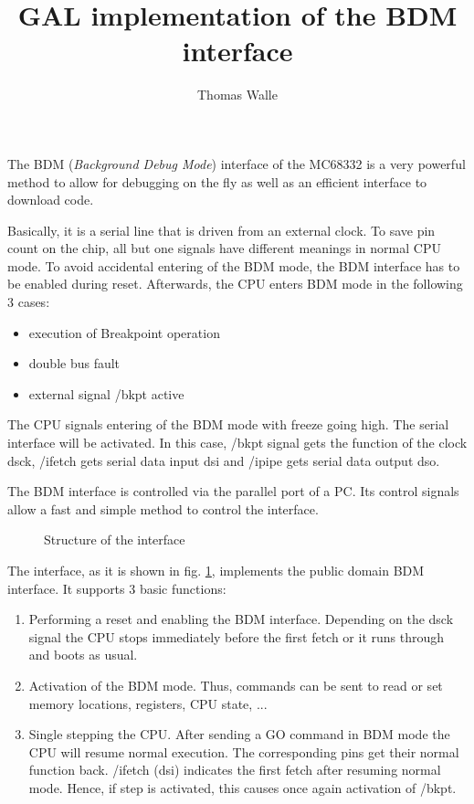 \documentclass[12pt]{article}
\title{GAL implementation of the BDM interface}
\author{Thomas Walle}
\newcommand{\bi}{\begin{itemize}}
\newcommand{\ei}{\end{itemize}}
\newcommand{\be}{\begin{enumerate}}
\newcommand{\ee}{\end{enumerate}}
\newcommand{\myfig}[4]{%
  \begin{figure}[htbp] \begin{center}%
  \makebox{\epsfysize=#2 \epsfbox{#1}} \caption{\label{#3} #4}%
  \end{center} \end{figure}}
\begin{document}
\maketitle

The BDM ({\it Background Debug Mode}) interface of the MC68332 is a
very powerful method to allow for debugging on the fly as well as an
efficient interface to download code.

Basically, it is a serial line that is driven from an external
clock. To save pin count on the chip, all but one signals have
different meanings in normal CPU mode. To avoid accidental entering of
the BDM mode, the BDM interface has to be enabled during
reset. Afterwards, the CPU enters BDM mode in the following 3 cases:

\bi
\item execution of Breakpoint operation
\item double bus fault
\item external signal {\sc /bkpt} active
\ei

The CPU signals entering of the BDM mode with {\sc freeze} going high.
The serial interface will be activated. In this case, {\sc /bkpt}
signal gets the function of the clock {\sc dsck}, {\sc /ifetch} gets
serial data input {\sc dsi} and {\sc /ipipe} gets serial data output
{\sc dso}.

The BDM interface is controlled via the parallel port of a PC. Its
control signals allow a fast and simple method to control the
interface.

\myfig{gal.eps}{70mm}{gal.fig}{Structure of the interface}

The interface, as it is shown in fig. \ref{gal.fig}, implements the
public domain BDM interface. It supports 3 basic functions:

\be
\item Performing a reset and enabling the BDM interface. Depending on
  the {\sc dsck} signal the CPU stops immediately before the first fetch or it
  runs through and boots as usual.
\item Activation of the BDM mode. Thus, commands can be sent to read
  or set memory locations, registers, CPU state, ...
\item Single stepping the CPU. After sending a GO command in BDM mode
  the CPU will resume normal execution. The corresponding pins get their
  normal function back. {\sc /ifetch} ({\sc dsi}) indicates the first
  fetch after resuming normal mode. Hence, if {\sc step} is activated,
  this causes once again activation of {\sc /bkpt}.  
\ee
\end{document}
